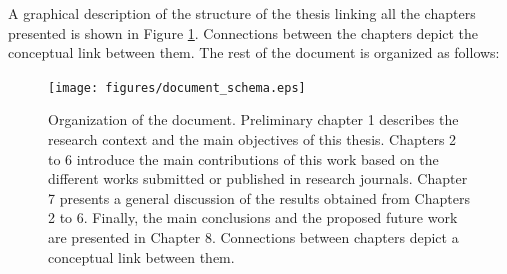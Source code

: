 A graphical description of the structure of the thesis linking all the chapters presented is shown in Figure \ref{document_structure}. Connections between the chapters depict the conceptual link between them. The rest of the document is organized as follows:

\begin{figure}[top]
  \begin{center}
    \texttt{[image: figures/document\_schema.eps]}
  \end{center}
    \caption{Organization of the document. Preliminary chapter 1 describes the research context and the main objectives of this thesis. Chapters 2 to 6 introduce the main contributions of this work based on the different works submitted or published in research journals. Chapter 7 presents a general discussion of the results obtained from Chapters 2 to 6. Finally, the main conclusions and the proposed future work are presented in Chapter 8. Connections between chapters depict a conceptual link between them.}
    \label{document_structure}
\end{figure}


